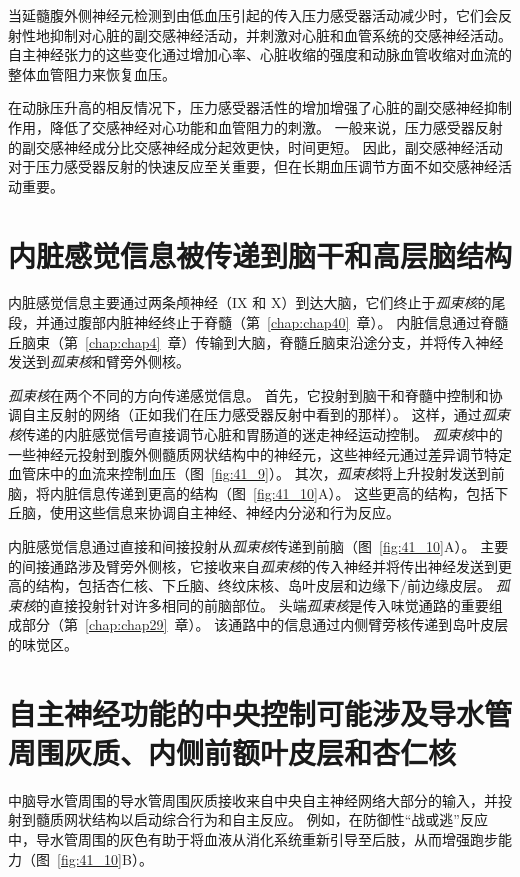 当延髓腹外侧神经元检测到由低血压引起的传入压力感受器活动减少时，它们会反射性地抑制对心脏的副交感神经活动，并刺激对心脏和血管系统的交感神经活动。
自主神经张力的这些变化通过增加心率、心脏收缩的强度和动脉血管收缩对血流的整体血管阻力来恢复血压。


在动脉压升高的相反情况下，压力感受器活性的增加增强了心脏的副交感神经抑制作用，降低了交感神经对心功能和血管阻力的刺激。
一般来说，压力感受器反射的副交感神经成分比交感神经成分起效更快，时间更短。
因此，副交感神经活动对于压力感受器反射的快速反应至关重要，但在长期血压调节方面不如交感神经活动重要。



\section{内脏感觉信息被传递到脑干和高层脑结构}

内脏感觉信息主要通过两条颅神经（IX 和 X）到达大脑，它们终止于\textit{孤束核}的尾段，并通过腹部内脏神经终止于脊髓（第~\ref{chap:chap40}~章）。
内脏信息通过脊髓丘脑束（第~\ref{chap:chap4}~章）传输到大脑，脊髓丘脑束沿途分支，并将传入神经发送到\textit{孤束核}和臂旁外侧核。


\textit{孤束核}在两个不同的方向传递感觉信息。
首先，它投射到脑干和脊髓中控制和协调自主反射的网络（正如我们在压力感受器反射中看到的那样）。
这样，通过\textit{孤束核}传递的内脏感觉信号直接调节心脏和胃肠道的迷走神经运动控制。
\textit{孤束核}中的一些神经元投射到腹外侧髓质网状结构中的神经元，这些神经元通过差异调节特定血管床中的血流来控制血压（图~\ref{fig:41_9}）。
其次，\textit{孤束核}将上升投射发送到前脑，将内脏信息传递到更高的结构（图~\ref{fig:41_10}A）。
这些更高的结构，包括下丘脑，使用这些信息来协调自主神经、神经内分泌和行为反应。


内脏感觉信息通过直接和间接投射从\textit{孤束核}传递到前脑（图~\ref{fig:41_10}A）。
主要的间接通路涉及臂旁外侧核，它接收来自\textit{孤束核}的传入神经并将传出神经发送到更高的结构，包括杏仁核、下丘脑、终纹床核、岛叶皮层和边缘下/前边缘皮层。
\textit{孤束核}的直接投射针对许多相同的前脑部位。
头端\textit{孤束核}是传入味觉通路的重要组成部分（第~\ref{chap:chap29}~章）。
该通路中的信息通过内侧臂旁核传递到岛叶皮层的味觉区。



\section{自主神经功能的中央控制可能涉及导水管周围灰质、内侧前额叶皮层和杏仁核}

中脑导水管周围的导水管周围灰质接收来自中央自主神经网络大部分的输入，并投射到髓质网状结构以启动综合行为和自主反应。
例如，在防御性“战或逃”反应中，导水管周围的灰色有助于将血液从消化系统重新引导至后肢，从而增强跑步能力（图~\ref{fig:41_10}B）。


